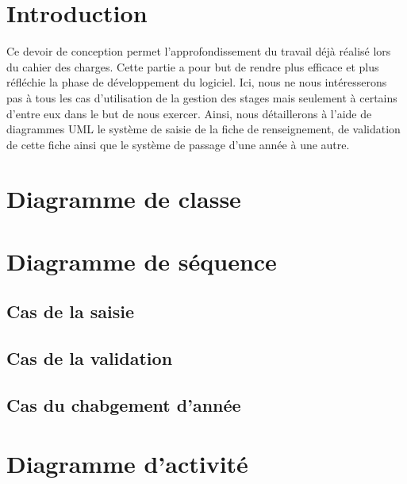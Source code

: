\documentclass{scrreprt}
\begin{document}
\tableofcontents

\chapter{Introduction}

	Ce devoir de conception permet l'approfondissement du travail déjà réalisé lors du
cahier des charges. Cette partie a pour but de rendre plus efficace et plus réfléchie la phase
de développement du logiciel. Ici, nous ne nous intéresserons pas à tous les cas d'utilisation
de la gestion des stages mais seulement à certains d'entre eux dans le but de nous exercer. Ainsi,
nous détaillerons à l'aide de diagrammes UML le système de saisie de la fiche de renseignement, de validation de cette fiche ainsi que le système de passage d'une année à une autre.  

\newpage
\chapter{Diagramme de classe}



\newpage
\chapter{Diagramme de séquence}

\section{Cas de la saisie}

\section{Cas de la validation}

\section{Cas du chabgement d'année}



\newpage
\chapter{Diagramme d'activité}
\end{document}
